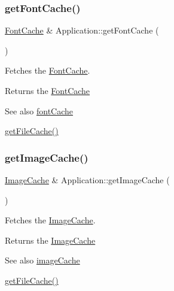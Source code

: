 \subsubsection{\texorpdfstring{getFontCache()}{getFontCache()}}
{\footnotesize\ttfamily \mbox{\hyperlink{classsage_1_1FontCache}{Font\+Cache}} \& Application\+::get\+Font\+Cache (\begin{DoxyParamCaption}{ }\end{DoxyParamCaption})}



Fetches the \mbox{\hyperlink{classsage_1_1FontCache}{Font\+Cache}}. 

\begin{DoxyReturn}{Returns}
the \mbox{\hyperlink{classsage_1_1FontCache}{Font\+Cache}} 
\end{DoxyReturn}
\begin{DoxySeeAlso}{See also}
\mbox{\hyperlink{classsage_1_1Application_a5b1d694037e52b302d32e99ff532277d}{font\+Cache}} 

\mbox{\hyperlink{classsage_1_1Application_adaacf80b3ecc3efdd4696b869ca3aedd}{get\+File\+Cache()}} 
\end{DoxySeeAlso}
\mbox{\label{classsage_1_1Application_a6659ce3fdb899bee814c0628dcbcc423}} 
\subsubsection{\texorpdfstring{getImageCache()}{getImageCache()}}
{\footnotesize\ttfamily \mbox{\hyperlink{classsage_1_1ImageCache}{Image\+Cache}} \& Application\+::get\+Image\+Cache (\begin{DoxyParamCaption}{ }\end{DoxyParamCaption})}



Fetches the \mbox{\hyperlink{classsage_1_1ImageCache}{Image\+Cache}}. 

\begin{DoxyReturn}{Returns}
the \mbox{\hyperlink{classsage_1_1ImageCache}{Image\+Cache}} 
\end{DoxyReturn}
\begin{DoxySeeAlso}{See also}
\mbox{\hyperlink{classsage_1_1Application_a951b28603bbc30da98db70a1757ac526}{image\+Cache}} 

\mbox{\hyperlink{classsage_1_1Application_adaacf80b3ecc3efdd4696b869ca3aedd}{get\+File\+Cache()}} 
\end{DoxySeeAlso}
\mbox{\label{classsage_1_1Application_a023b31b837007c82c91dab8be17d149c}} 
